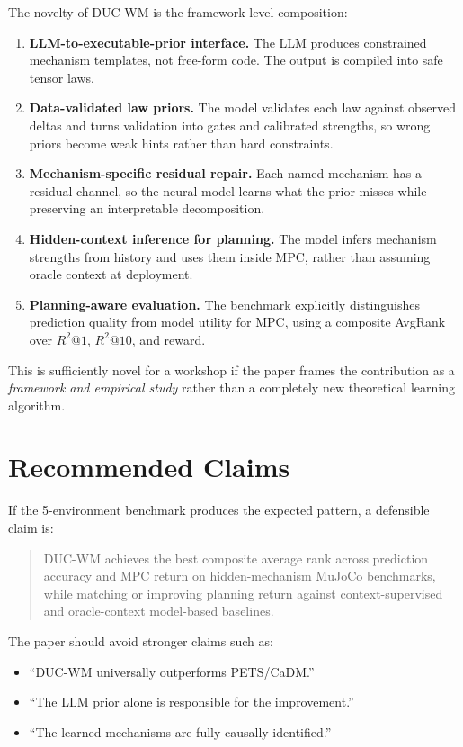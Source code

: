 \documentclass[11pt]{article}
\begin{document}
The novelty of DUC-WM is the framework-level composition:
\begin{enumerate}[leftmargin=1.5em]
    \item \textbf{LLM-to-executable-prior interface.}
    The LLM produces constrained mechanism templates, not free-form code. The output is compiled into safe tensor laws.

    \item \textbf{Data-validated law priors.}
    The model validates each law against observed deltas and turns validation into gates and calibrated strengths, so wrong priors become weak hints rather than hard constraints.

    \item \textbf{Mechanism-specific residual repair.}
    Each named mechanism has a residual channel, so the neural model learns what the prior misses while preserving an interpretable decomposition.

    \item \textbf{Hidden-context inference for planning.}
    The model infers mechanism strengths from history and uses them inside MPC, rather than assuming oracle context at deployment.

    \item \textbf{Planning-aware evaluation.}
    The benchmark explicitly distinguishes prediction quality from model utility for MPC, using a composite AvgRank over $R^2@1$, $R^2@10$, and reward.
\end{enumerate}

This is sufficiently novel for a workshop if the paper frames the contribution as a \emph{framework and empirical study} rather than a completely new theoretical learning algorithm.

\section{Recommended Claims}

If the 5-environment benchmark produces the expected pattern, a defensible claim is:

\begin{quote}
DUC-WM achieves the best composite average rank across prediction accuracy and MPC return on hidden-mechanism MuJoCo benchmarks, while matching or improving planning return against context-supervised and oracle-context model-based baselines.
\end{quote}

The paper should avoid stronger claims such as:
\begin{itemize}[leftmargin=1.5em]
    \item ``DUC-WM universally outperforms PETS/CaDM.''
    \item ``The LLM prior alone is responsible for the improvement.''
    \item ``The learned mechanisms are fully causally identified.''
\end{itemize}
\end{document}
